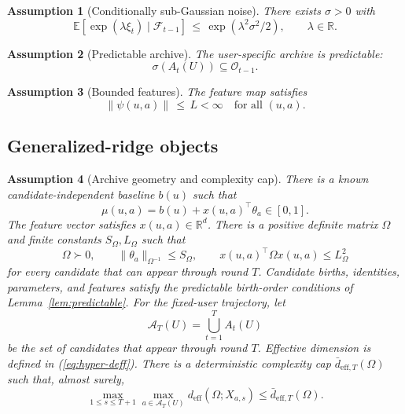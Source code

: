 \documentclass{article} %
\newtheorem{assumption}{Assumption}
\providecommand{\E}{\mathbb{E}}
\renewcommand{\eqref}[1]{\textup{(\ref{#1})}}
\begin{document}
\begin{assumption}[Conditionally sub-Gaussian noise]
\label{ass:subg}
There exists $\sigma > 0$ with
\begin{equation}
\label{eq:ass-subg}
\E\!\left[\exp(\lambda \xi_t) \mid \mathcal{F}_{t-1}\right] \,\le\, \exp(\lambda^2 \sigma^2 / 2), \qquad \lambda \in \mathbb{R}.
\end{equation}
\end{assumption}

\begin{assumption}[Predictable archive]
\label{ass:predictable}
The user-specific archive is predictable:
\begin{equation}
\label{eq:ass-pred}
\sigma(A_t(U)) \subseteq \mathcal{O}_{t-1}.
\end{equation}
\end{assumption}

\begin{assumption}[Bounded features]
\label{ass:bounded-feat}
The feature map satisfies
\begin{equation}
\label{eq:ass-feat}
\|\psi(u,a)\| \,\le\, L < \infty \quad \text{for all } (u,a).
\end{equation}
\end{assumption}

\subsection{Generalized-ridge objects}

\begin{assumption}[Archive geometry and complexity cap]
\label{assump:shared-structure}
There is a known candidate-independent baseline $b(u)$ such that
\begin{equation}
\label{eq:hyper-linear-model}
\mu(u,a)
=
b(u)+x(u,a)^{\top}\theta_a
\in[0,1].
\end{equation}
The feature vector satisfies $x(u,a)\in\mathbb{R}^d$. There is a positive
definite matrix $\Omega$ and finite constants $S_\Omega,L_\Omega$ such that
\begin{equation}
\label{eq:hyper-pd}
\Omega\succ0,\qquad
\|\theta_a\|_{\Omega^{-1}}\le S_\Omega,\qquad
x(u,a)^\top\Omega x(u,a)\le L_\Omega^2
\end{equation}
for every candidate that can appear through round $T$. Candidate births,
identities, parameters, and features satisfy the predictable birth-order
conditions of Lemma~\ref{lem:predictable}. For the fixed-user trajectory, let
\begin{equation}
\label{eq:hyper-realized-union-main}
\mathcal A_T(U)
=
\bigcup_{t=1}^{T}A_t(U)
\end{equation}
be the set of candidates that appear through round $T$.
Effective dimension is defined in \eqref{eq:hyper-deff}.
There is a deterministic complexity cap $\bar d_{\mathrm{eff},T}(\Omega)$ such
that, almost surely,
\begin{equation}
\label{eq:hyper-low-deff}
\max_{1\le s\le T+1}\max_{a\in\mathcal A_T(U)}
d_{\mathrm{eff}}(\Omega;X_{a,s})
\le
\bar d_{\mathrm{eff},T}(\Omega).
\end{equation}
\end{assumption}
\end{document}
